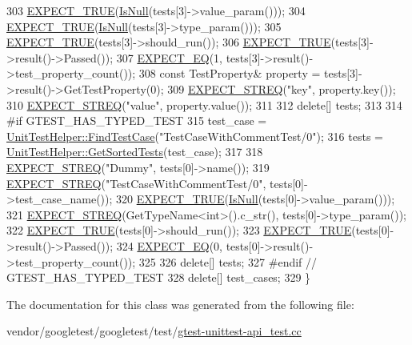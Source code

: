 \begin{DoxyCode}
303     \hyperlink{gtest_8h_ac33e7cdfb5d44a7a0f0ab552eb5c3c6a}{EXPECT\_TRUE}(\hyperlink{namespacetesting_1_1internal_adcfd37a66bc4cb0e8291cf46e1a6c72b}{IsNull}(tests[3]->value\_param()));
304     \hyperlink{gtest_8h_ac33e7cdfb5d44a7a0f0ab552eb5c3c6a}{EXPECT\_TRUE}(\hyperlink{namespacetesting_1_1internal_adcfd37a66bc4cb0e8291cf46e1a6c72b}{IsNull}(tests[3]->type\_param()));
305     \hyperlink{gtest_8h_ac33e7cdfb5d44a7a0f0ab552eb5c3c6a}{EXPECT\_TRUE}(tests[3]->should\_run());
306     \hyperlink{gtest_8h_ac33e7cdfb5d44a7a0f0ab552eb5c3c6a}{EXPECT\_TRUE}(tests[3]->result()->Passed());
307     \hyperlink{gtest_8h_a4159019abda84f5366acdb7604ff220a}{EXPECT\_EQ}(1, tests[3]->result()->test\_property\_count());
308     \textcolor{keyword}{const} TestProperty& \textcolor{keyword}{property} = tests[3]->result()->GetTestProperty(0);
309     \hyperlink{gtest_8h_ad20f7b94ac5081e16f0005b94e95f0c6}{EXPECT\_STREQ}(\textcolor{stringliteral}{"key"}, property.key());
310     \hyperlink{gtest_8h_ad20f7b94ac5081e16f0005b94e95f0c6}{EXPECT\_STREQ}(\textcolor{stringliteral}{"value"}, property.value());
311 
312     \textcolor{keyword}{delete}[] tests;
313 
314 \textcolor{preprocessor}{#if GTEST\_HAS\_TYPED\_TEST}
315     test\_case = \hyperlink{classtesting_1_1internal_1_1UnitTestHelper_a46303cbb7a6abb456f7b1350542113ac}{UnitTestHelper::FindTestCase}(\textcolor{stringliteral}{"TestCaseWithCommentTest/0"});
316     tests = \hyperlink{classtesting_1_1internal_1_1UnitTestHelper_a02602d22fb74566dad78c0c9d4f24e78}{UnitTestHelper::GetSortedTests}(test\_case);
317 
318     \hyperlink{gtest_8h_ad20f7b94ac5081e16f0005b94e95f0c6}{EXPECT\_STREQ}(\textcolor{stringliteral}{"Dummy"}, tests[0]->name());
319     \hyperlink{gtest_8h_ad20f7b94ac5081e16f0005b94e95f0c6}{EXPECT\_STREQ}(\textcolor{stringliteral}{"TestCaseWithCommentTest/0"}, tests[0]->test\_case\_name());
320     \hyperlink{gtest_8h_ac33e7cdfb5d44a7a0f0ab552eb5c3c6a}{EXPECT\_TRUE}(\hyperlink{namespacetesting_1_1internal_adcfd37a66bc4cb0e8291cf46e1a6c72b}{IsNull}(tests[0]->value\_param()));
321     \hyperlink{gtest_8h_ad20f7b94ac5081e16f0005b94e95f0c6}{EXPECT\_STREQ}(GetTypeName<int>().c\_str(), tests[0]->type\_param());
322     \hyperlink{gtest_8h_ac33e7cdfb5d44a7a0f0ab552eb5c3c6a}{EXPECT\_TRUE}(tests[0]->should\_run());
323     \hyperlink{gtest_8h_ac33e7cdfb5d44a7a0f0ab552eb5c3c6a}{EXPECT\_TRUE}(tests[0]->result()->Passed());
324     \hyperlink{gtest_8h_a4159019abda84f5366acdb7604ff220a}{EXPECT\_EQ}(0, tests[0]->result()->test\_property\_count());
325 
326     \textcolor{keyword}{delete}[] tests;
327 \textcolor{preprocessor}{#endif  // GTEST\_HAS\_TYPED\_TEST}
328     \textcolor{keyword}{delete}[] test\_cases;
329   \}
\end{DoxyCode}


The documentation for this class was generated from the following file\+:\begin{DoxyCompactItemize}
\item 
vendor/googletest/googletest/test/\hyperlink{gtest-unittest-api__test_8cc}{gtest-\/unittest-\/api\+\_\+test.\+cc}\end{DoxyCompactItemize}
